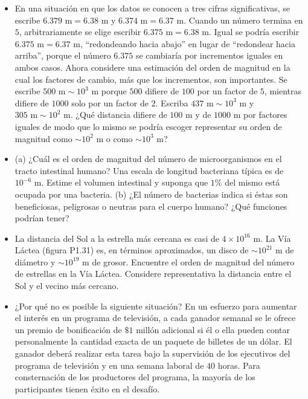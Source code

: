\documentclass[11pt,a4paper]{article}
\begin{document}
\begin{itemize}
    \item[\textbf{29.}] En una situación en que los datos se conocen a tres cifras significativas, se escribe $6.379 \text{ m} = 6.38 \text{ m}$ y $6.374 \text{ m} = 6.37 \text{ m}$. Cuando un número termina en $5$, arbitrariamente se elige escribir $6.375 \text{ m} = 6.38 \text{ m}$. Igual se podría escribir $6.375 \text{ m} = 6.37 \text{ m}$, ``redondeando hacia abajo'' en lugar de ``redondear hacia arriba'', porque el número $6.375$ se cambiaría por incrementos iguales en ambos casos. Ahora considere una estimación del orden de magnitud en la cual los factores de cambio, más que los incrementos, son importantes. Se escribe $500 \text{ m} \sim 10^3 \text{ m}$ porque $500$ difiere de $100$ por un factor de $5$, mientras difiere de $1000$ solo por un factor de $2$. Escriba $437 \text{ m} \sim 10^3 \text{ m}$ y $305 \text{ m} \sim 10^2 \text{ m}$. ¿Qué distancia difiere de $100 \text{ m}$ y de $1000 \text{ m}$ por factores iguales de modo que lo mismo se podría escoger representar su orden de magnitud como $\sim 10^2 \text{ m}$ o como $\sim 10^3 \text{ m}$?
    \vspace*{7cm}
    
    \item[\textbf{30.}] (a) ¿Cuál es el orden de magnitud del número de microorganismos en el tracto intestinal humano? Una escala de longitud bacteriana típica es de $10^{-6} \text{ m}$. Estime el volumen intestinal y suponga que $1\%$ del mismo está ocupada por una bacteria. (b) ¿El número de bacterias indica si éstas son beneficiosas, peligrosas o neutras para el cuerpo humano? ¿Qué funciones podrían tener?
    \vspace*{8cm}
    
    \item[\textbf{31.}] La distancia del Sol a la estrella más cercana es casi de $4 \times 10^{16} \text{ m}$. La Vía Láctea (figura P1.31) es, en términos aproximados, un disco de $\sim 10^{21} \text{ m}$ de diámetro y $\sim 10^{19} \text{ m}$ de grosor. Encuentre el orden de magnitud del número de estrellas en la Vía Láctea. Considere representativa la distancia entre el Sol y el vecino más cercano.
    \vspace*{8cm}
    
    \item[\textbf{32.}] ¿Por qué no es posible la siguiente situación? En un esfuerzo para aumentar el interés en un programa de televisión, a cada ganador semanal se le ofrece un premio de bonificación de $\$1$ millón adicional si él o ella pueden contar personalmente la cantidad exacta de un paquete de billetes de un dólar. El ganador deberá realizar esta tarea bajo la supervisión de los ejecutivos del programa de televisión y en una semana laboral de $40$ horas. Para consternación de los productores del programa, la mayoría de los participantes tienen éxito en el desafío.
    \vspace*{7cm}
    

\end{itemize}
\end{document}
